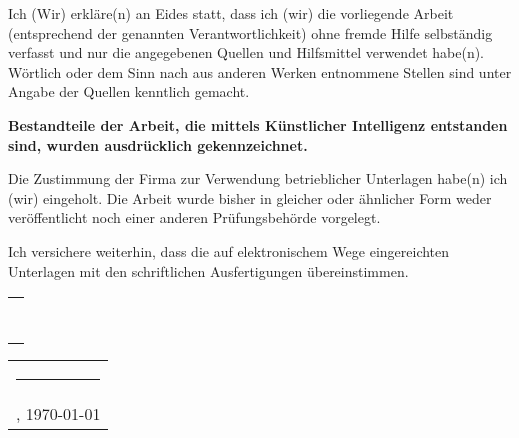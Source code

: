 \documentclass[../main.tex]{subfiles}
\begin{document}
        Ich (Wir) erkläre(n) an Eides statt, dass ich (wir) die vorliegende Arbeit (entsprechend
	der genannten Verantwortlichkeit) ohne fremde Hilfe selbständig verfasst und nur die angegebenen Quellen 
	und Hilfsmittel verwendet habe(n). Wörtlich oder dem Sinn nach aus anderen Werken entnommene Stellen sind unter Angabe der Quellen kenntlich gemacht. 
	
	\ifuseAI
		\textbf{Bestandteile der Arbeit, die mittels Künstlicher Intelligenz entstanden sind, wurden ausdrücklich gekennzeichnet.}
		\medskip
	\fi

	Die Zustimmung der Firma zur Verwendung betrieblicher Unterlagen habe(n) ich (wir)
	eingeholt. Die Arbeit wurde bisher in gleicher oder ähnlicher Form weder
	veröffentlicht noch einer anderen Prüfungsbehörde vorgelegt.
	\medskip

	Ich versichere weiterhin, dass die auf elektronischem Wege eingereichten Unterlagen
	mit den schriftlichen Ausfertigungen übereinstimmen.

	\vspace{15mm}
	\hfill%
	\begin{tabular}[t]{c}
		\rule{10em}{0.4pt}      \\
		\theauthor
	\end{tabular}%
	\hfill%
	\begin{tabular}[t]{c}
		\rule{10em}{0.4pt} \\
		\location, \today
	\end{tabular}%
	\hfill\strut
\end{document}
